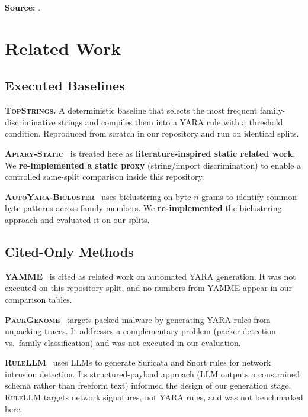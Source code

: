 \documentclass[10pt,twocolumn]{article}
\newcommand{\topstrings}{\textsc{TopStrings}\xspace}
\newcommand{\apiary}{\textsc{Apiary-Static}\xspace}
\newcommand{\autoyara}{\textsc{AutoYara-Bicluster}\xspace}
\newcommand{\yamme}{\textsc{YAMME}\xspace}
\newcommand{\packgenome}{\textsc{PackGenome}\xspace}
\newcommand{\rulellm}{\textsc{RuleLLM}\xspace}
\begin{document}
\smallskip
\noindent\textbf{Source: }.

\section{Related Work}
\label{sec:related}

\subsection{Executed Baselines}

\textbf{\topstrings.}  A deterministic baseline that selects the most
frequent family-discriminative strings and compiles them into a YARA
rule with a threshold condition.  Reproduced from scratch in our
repository and run on identical splits.

\textbf{\apiary}~\cite{apiary2023ccs} is treated here as
\textbf{literature-inspired static related work}.  We
\textbf{re-implemented a static proxy} (string/import discrimination)
to enable a controlled same-split comparison inside this repository.

\textbf{\autoyara}~\cite{autoyara2020} uses biclustering on byte
$n$-grams to identify common byte patterns across family members.  We
\textbf{re-implemented} the biclustering approach and evaluated it on
our splits.

\subsection{Cited-Only Methods}

\textbf{\yamme}~\cite{yamme2023} is cited as related work on automated
YARA generation.  It was not executed on this repository split, and
no numbers from \yamme appear in our comparison tables.

\textbf{\packgenome}~\cite{packgenome2023ccs} targets packed malware
by generating YARA rules from unpacking traces.  It addresses a
complementary problem (packer detection vs.\ family classification)
and was not executed in our evaluation.

\textbf{\rulellm}~\cite{rulellm2025} uses LLMs to generate Suricata
and Snort rules for network intrusion detection.  Its
structured-payload approach (LLM outputs a constrained schema rather
than freeform text) informed the design of our generation stage.
\rulellm targets network signatures, not YARA rules, and was not
benchmarked here.
\end{document}
